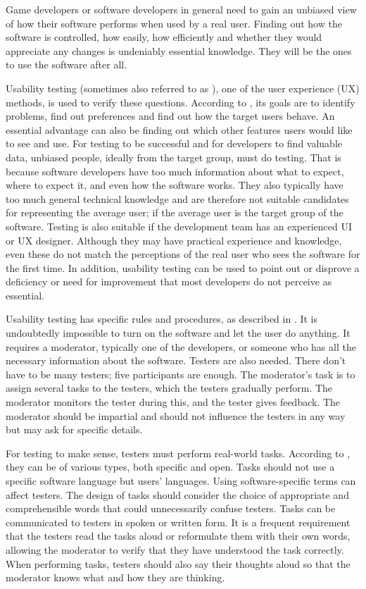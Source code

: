 Game developers or software developers in general need to gain an unbiased view of how their software performs when used by a real user.
Finding out how the software is controlled, how easily, how efficiently and whether they would appreciate any changes is undeniably essential knowledge.
They will be the ones to use the software after all.

Usability testing (sometimes also referred to as ), one of the user experience (UX) methods, is used to verify these questions.
According to \cite{moran_2019_usability}, its goals are to identify problems, find out preferences and find out how the target users behave.
An essential advantage can also be finding out which other features users would like to see and use.
For testing to be successful and for developers to find valuable data, unbiased people, ideally from the target group, must do testing.
That is because software developers have too much information about what to expect, where to expect it, and even how the software works.
They also typically have too much general technical knowledge and are therefore not suitable candidates for representing the average user; if the average user is the target group of the software.
Testing is also suitable if the development team has an experienced UI or UX designer.
Although they may have practical experience and knowledge, even these do not match the perceptions of the real user who sees the software for the first time.
In addition, usability testing can be used to point out or disprove a deficiency or need for improvement that most developers do not perceive as essential.

Usability testing has specific rules and procedures, as described in \cite{moran_2019_usability}.
It is undoubtedly impossible to turn on the software and let the user do anything.
It requires a moderator, typically one of the developers, or someone who has all the necessary information about the software.
Testers are also needed.
There don't have to be many testers; five participants are enough.
The moderator's task is to assign several tasks to the testers, which the testers gradually perform.
The moderator monitors the tester during this, and the tester gives feedback.
The moderator should be impartial and should not influence the testers in any way but may ask for specific details.

For testing to make sense, testers must perform real-world tasks.
According to \cite{moran_2019_usability}, they can be of various types, both specific and open.
Tasks should not use a specific software language but users' languages.
Using software-specific terms can affect testers.
The design of tasks should consider the choice of appropriate and comprehensible words that could unnecessarily confuse testers.
Tasks can be communicated to testers in spoken or written form.
It is a frequent requirement that the testers read the tasks aloud or reformulate them with their own words, allowing the moderator to verify that they have understood the task correctly.
When performing tasks, testers should also say their thoughts aloud so that the moderator knows what and how they are thinking.

